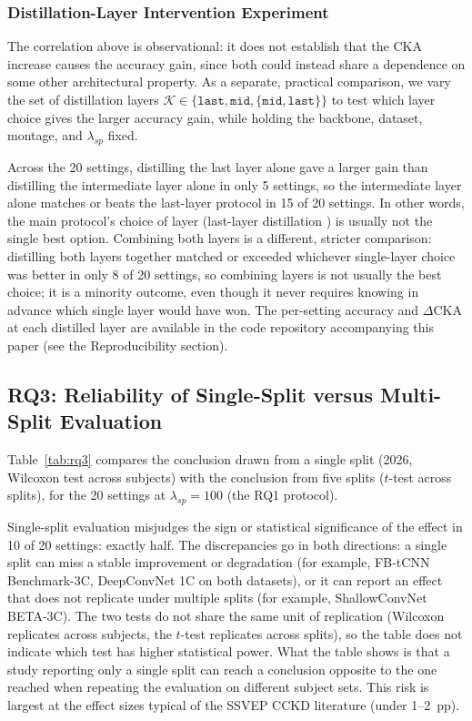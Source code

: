 \documentclass[11pt,a4paper,twoside,asymmetric]{article}
\begin{document}
\subsubsection{Distillation-Layer Intervention Experiment}
\label{sec:layer_intervention}

The correlation above is observational: it does not establish that the CKA increase causes the accuracy gain, since both could instead share a dependence on some other architectural property. As a separate, practical comparison, we vary the set of distillation layers $\mathcal{K} \in \{\texttt{last}, \texttt{mid}, \{\texttt{mid},\texttt{last}\}\}$ to test which layer choice gives the larger accuracy gain, while holding the backbone, dataset, montage, and $\lambda_{sp}$ fixed.

Across the 20 settings, distilling the last layer alone gave a larger gain than distilling the intermediate layer alone in only 5 settings, so the intermediate layer alone matches or beats the last-layer protocol in 15 of 20 settings. In other words, the main protocol's choice of layer (last-layer distillation \cite{R82}) is usually not the single best option. Combining both layers is a different, stricter comparison: distilling both layers together matched or exceeded whichever single-layer choice was better in only 8 of 20 settings, so combining layers is not usually the best choice; it is a minority outcome, even though it never requires knowing in advance which single layer would have won. The per-setting accuracy and $\Delta$CKA at each distilled layer are available in the code repository accompanying this paper (see the Reproducibility section).

\subsection{RQ3: Reliability of Single-Split versus Multi-Split Evaluation}
\label{sec:rq3}

Table~\ref{tab:rq3} compares the conclusion drawn from a single split (2026, Wilcoxon test across subjects) with the conclusion from five splits ($t$-test across splits), for the 20 settings at $\lambda_{sp}=100$ (the RQ1 protocol).

Single-split evaluation misjudges the sign or statistical significance of the effect in 10 of 20 settings: exactly half. The discrepancies go in both directions: a single split can miss a stable improvement or degradation (for example, FB-tCNN Benchmark-3C, DeepConvNet 1C on both datasets), or it can report an effect that does not replicate under multiple splits (for example, ShallowConvNet BETA-3C). The two tests do not share the same unit of replication (Wilcoxon replicates across subjects, the $t$-test replicates across splits), so the table does not indicate which test has higher statistical power. What the table shows is that a study reporting only a single split can reach a conclusion opposite to the one reached when repeating the evaluation on different subject sets. This risk is largest at the effect sizes typical of the SSVEP CCKD literature (under 1--2~pp).
\end{document}
